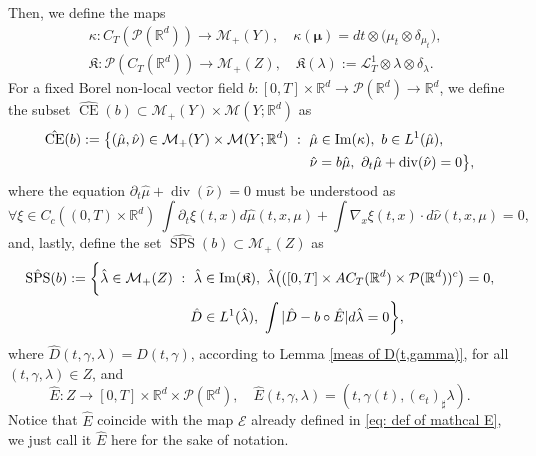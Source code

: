 \documentclass[10pt,leqno]{amsart}
\numberwithin{equation}{section}
\newcommand{\R}{\mathbb{R}}
\newcommand{\PP}{\mathcal{P}}
\newcommand{\CE}{\operatorname{CE}}
\begin{document}
Then, we define the maps
\begin{equation}\label{eq: def of kappa and mathfrak K}
    \begin{aligned}
        &\kappa: C_T(\PP(\R^d)) \to \mathcal{M}_+(Y), \quad  \kappa(\boldsymbol{\mu}) = dt\otimes \big( \mu_t \otimes\delta_{\mu_t} \big),
        \\
        & \mathfrak{K}:\PP(C_T(\R^d)) \to \mathcal{M}_+(Z), \quad \mathfrak{K}(\lambda):= \mathcal{L}^1_T\otimes \lambda\otimes\delta_{\lambda}.
    \end{aligned}
\end{equation}
For a fixed Borel non-local vector field $b:[0,T]\times \R^d \to \PP(\R^d) \to \R^d$, we define the subset $\hat{\CE}(b)\subset \mathcal{M}_+(Y)\times \mathcal{M}(Y;\R^d)$ as
\begin{equation}\label{eq: def of hat ce(b)}
    \begin{aligned}
    & \hat{\operatorname{CE}}(b):= \big\{(\hat{\mu},\hat{\nu})\in \mathcal{M}_+(Y)\times\mathcal{M}(Y;\R^d) \ : \ \hat{\mu} \in \operatorname{Im}(\kappa), \ b\in L^1(\hat{\mu}), \\
    & \hspace{6.68cm} \hat{\nu} = b\hat{\mu},\ \partial_t\hat{\mu}+ \operatorname{div}(\hat{\nu})= 0 \big\},
    \end{aligned}
\end{equation}
where the equation $\partial_t \hat{\mu} + \operatorname{div}(\hat{\nu}) = 0$ must be understood as 
\[\forall \xi \in C_c((0,T)\times\R^d) \ \int \partial_t\xi(t,x) d\hat{\mu}(t,x,\mu) + \int \nabla_x \xi(t,x)\cdot d\hat{\nu}(t,x,\mu) = 0,\]
and, lastly, define the set $\hat{\operatorname{SPS}}(b)\subset\mathcal{M}_+(Z)$ as
\begin{equation}\label{eq: def of hat sps(b)}
\begin{aligned}
    & \hat{\operatorname{SPS}}(b):= \bigg\{\hat{\lambda} \in \mathcal{M}_+(Z) \ : \ \hat{\lambda} \in \operatorname{Im}(\mathfrak{K}), \  \hat{\lambda}\big(([0,T]\times AC_T(\R^d) \times \PP(\R^d))^c\big)=0, \\
        & \hspace{4.15cm} \hat{D}\in L^1(\hat{\lambda}), \ \int |\hat{D}-b\circ \hat{E}| d\hat{\lambda}=0\bigg\},
    \end{aligned}
\end{equation}
where $\hat{D}(t,\gamma,\lambda) = D(t,\gamma)$, according to Lemma \ref{meas of D(t,gamma)}, for all $(t,\gamma,\lambda) \in Z$, and 
\begin{equation}\label{eq: def of hat E}
    \hat{E}: Z \to [0,T]\times \R^d \times \PP(\R^d), \quad \hat{E}(t,\gamma,\lambda) = (t,\gamma(t),(e_t)_\sharp \lambda).
\end{equation}
Notice that $\hat{E}$ coincide with the map $\mathcal{E}$ already defined in \eqref{eq: def of mathcal E}, we just call it $\hat{E}$ here for the sake of notation.
\end{document}
